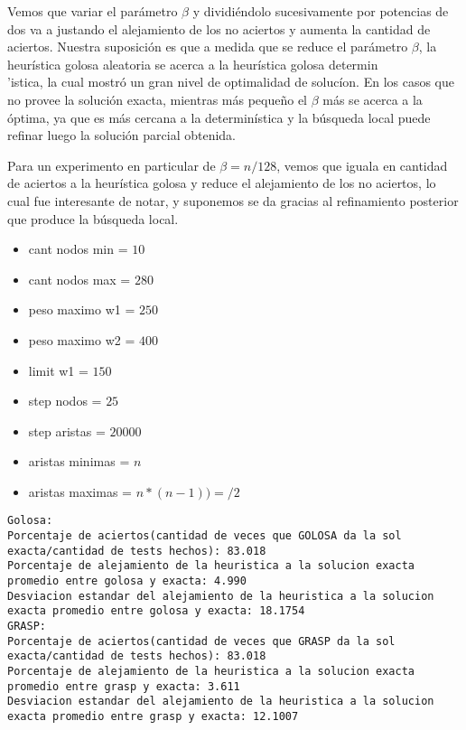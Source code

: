Vemos que variar el par\'ametro $\beta$ y dividi\'endolo sucesivamente por potencias de dos va a justando el alejamiento de los no aciertos y aumenta la cantidad de aciertos. Nuestra suposici\'on es que a medida que se reduce el par\'ametro $\beta$, la heur\'istica golosa aleatoria se acerca a la heur\'istica golosa determin\\'istica, la cual mostr\'o un gran nivel de optimalidad de soluc\'ion. En los casos que no provee la soluci\'on exacta, mientras m\'as peque\~no el $\beta$ m\'as se acerca a la \'optima, ya que es m\'as cercana a la determin\'istica y la b\'usqueda local puede refinar luego la soluci\'on parcial obtenida.
\vspace{2mm}


Para un experimento en particular de $\beta = n/128$, vemos que iguala en cantidad de aciertos a la heur\'istica golosa y reduce el alejamiento de los no aciertos, lo cual fue interesante de notar, y suponemos se da gracias al refinamiento posterior que produce la b\'usqueda local.
\begin{itemize}
	\item cant nodos min = $10$
	\item cant nodos max = $280$
	\item peso maximo w1 = $250$
	\item peso maximo w2 = $400$
	\item limit w1 = $150$
	\item step nodos = $25$
	\item step aristas = $20000$
	\item aristas minimas = $n$
	\item aristas maximas = $n * (n-1))=/2$
\end{itemize}


\begin{lstlisting}[frame=single]
Golosa:
Porcentaje de aciertos(cantidad de veces que GOLOSA da la sol exacta/cantidad de tests hechos): 83.018
Porcentaje de alejamiento de la heuristica a la solucion exacta promedio entre golosa y exacta: 4.990
Desviacion estandar del alejamiento de la heuristica a la solucion exacta promedio entre golosa y exacta: 18.1754
GRASP:
Porcentaje de aciertos(cantidad de veces que GRASP da la sol exacta/cantidad de tests hechos): 83.018
Porcentaje de alejamiento de la heuristica a la solucion exacta promedio entre grasp y exacta: 3.611
Desviacion estandar del alejamiento de la heuristica a la solucion exacta promedio entre grasp y exacta: 12.1007
\end{lstlisting}

